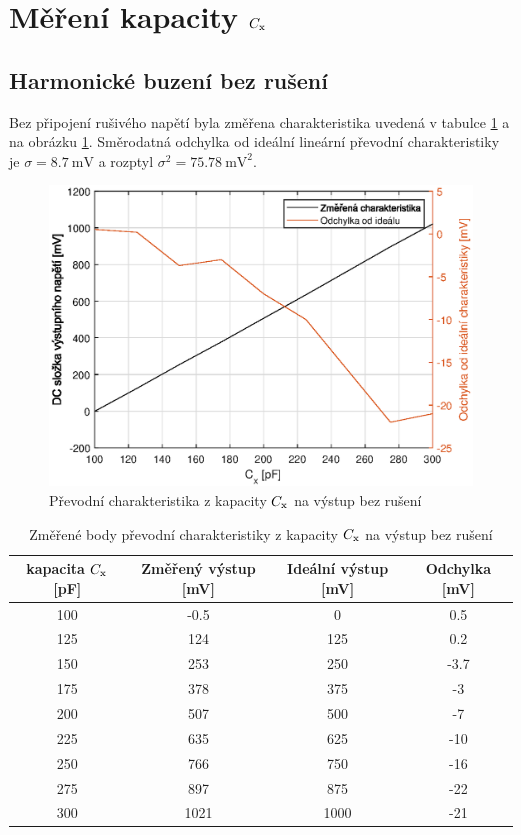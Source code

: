 \documentclass[twoside]{article}
\newcommand{\Cx}{C_{\rm x}}
\begin{document}
\clearpage

\section{Měření kapacity $\Cx$}

\subsection{Harmonické buzení bez rušení}
Bez připojení rušivého napětí byla změřena charakteristika uvedená v tabulce \ref{tab:mereni-c}
a na obrázku \ref{fig:mereni-c}. Směrodatná odchylka od ideální lineární
převodní charakteristiky je $\sigma = \SI{8.7}{\milli\volt}$ a rozptyl
$\sigma^2 = \SI{75.78}{\milli\volt\squared}$.

\begin{figure}[h]
    \centering
    \includegraphics[width=\textwidth]{mereni-c.eps}
    \caption{Převodní charakteristika z kapacity $\Cx$ na výstup bez rušení}
    \label{fig:mereni-c}
\end{figure}

\begin{table}[h]
    \centering
    \begin{tabular}{c|c|c|c}
        kapacita $\Cx$ [pF] & Změřený výstup [mV] & Ideální výstup [mV] & Odchylka [mV] \\\hline
    100 &  -0.5  &       0 &   0.5 \\
    125 &   124  &  125 &      0.2\\
    150 &   253  &  250 &     -3.7\\
    175 &   378  &  375 &     -3 \\
    200 &   507  &  500 &     -7 \\
    225 &   635  &  625 &    -10 \\
    250 &   766  &  750 &    -16 \\
    275 &   897  &  875 &    -22 \\
    300 &   1021  &  1000 &  -21 \\        
    \end{tabular}
    \caption{Změřené body převodní charakteristiky z kapacity $\Cx$ na výstup bez rušení}
    \label{tab:mereni-c}
\end{table}
\end{document}
